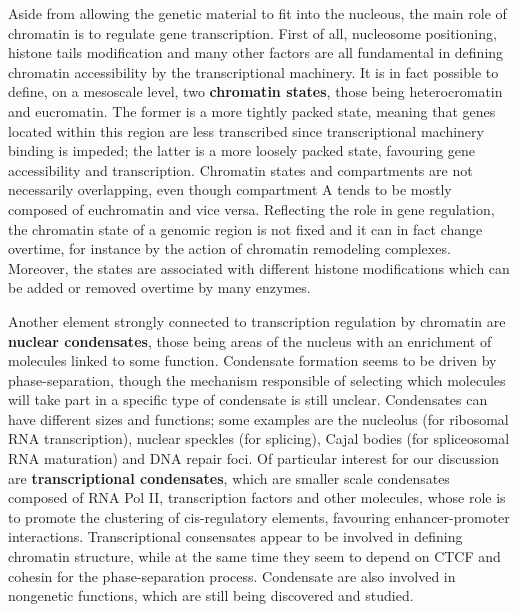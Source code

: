 Aside from allowing the genetic material to fit into the nucleous, the main role of chromatin is to regulate gene transcription. First of all, nucleosome positioning, histone tails modification and many other factors are all fundamental in defining chromatin accessibility by the transcriptional machinery\cite{chromatinfiber2015, histonemodification2007}. It is in fact possible to define, on a mesoscale level, two \textbf{chromatin states}, those being heterocromatin and eucromatin. The former is a more tightly packed state, meaning that genes located within this region are less transcribed since transcriptional machinery binding is impeded; the latter is a more loosely packed state, favouring gene accessibility and transcription\cite{heterochromatin2020}. Chromatin states and compartments are not necessarily overlapping, even though compartment A tends to be mostly composed of euchromatin and vice versa. Reflecting the role in gene regulation, the chromatin state of a genomic region is not fixed and it can in fact change overtime, for instance by the action of chromatin remodeling complexes\cite{chromatinremodeling2021}. Moreover, the states are associated with different histone modifications which can be added or removed overtime by many enzymes\cite{histonemodifications2020, epigeneticbook2020}.

Another element strongly connected to transcription regulation by chromatin are \textbf{nuclear condensates}, those being areas of the nucleus with an enrichment of molecules linked to some function\cite{condensates2023}. Condensate formation seems to be driven by phase-separation, though the mechanism responsible of selecting which molecules will take part in a specific type of condensate is still unclear\cite{phaseseparation2022}. Condensates can have different sizes and functions; some examples are the nucleolus (for ribosomal RNA transcription), nuclear speckles (for splicing), Cajal bodies (for spliceosomal RNA maturation) and DNA repair foci\cite{condensatetypes2020}. Of particular interest for our discussion are \textbf{transcriptional condensates}, which are smaller scale condensates composed of RNA Pol II, transcription factors and other molecules, whose role is to promote the clustering of cis-regulatory elements, favouring enhancer-promoter interactions\cite{condensatecomposition2018, condensateenhancer2018}. Transcriptional consensates appear to be involved in defining chromatin structure, while at the same time they seem to depend on CTCF and cohesin for the phase-separation process\cite{condensatectcf2022, condensatecohesin2021}. Condensate are also involved in nongenetic functions, which are still being discovered and studied\cite{condensates2023}.

